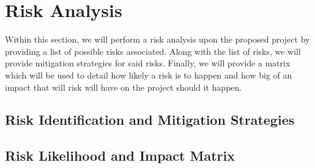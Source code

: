 \chapter{Risk Analysis}
	\label{chap:risk}

    Within this section, we will perform a risk analysis upon the proposed project by providing a list of possible risks associated. Along with the list of risks, we will provide mitigation strategies for said risks. Finally, we will provide a matrix which will be used to detail how likely a risk is to happen and how big of an impact that will risk will have on the project should it happen.

	\section{Risk Identification and Mitigation Strategies}

    	\vspace{3em}
    	
		\vspace{6em}

	\section{Risk Likelihood and Impact Matrix}
